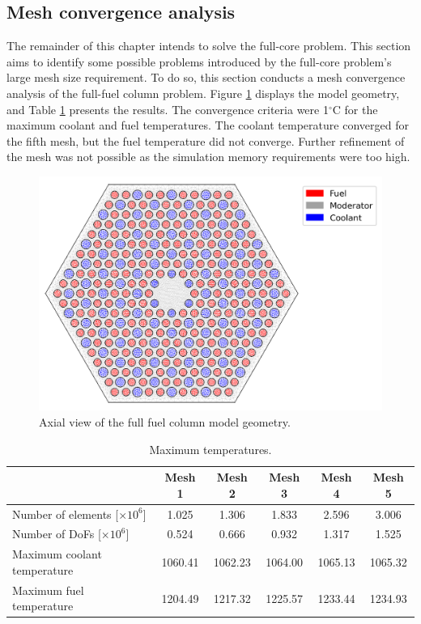 \subsection{Mesh convergence analysis}
\label{sec:meshconverge}

The remainder of this chapter intends to solve the full-core problem.
This section aims to identify some possible problems introduced by the full-core problem's large mesh size requirement.
To do so, this section conducts a mesh convergence analysis of the full-fuel column problem.
Figure \ref{fig:th-full-assem-mesh} displays the model geometry, and Table \ref{tab:th-full-assem-results} presents the results.
The convergence criteria were 1$^{\circ}$C for the maximum coolant and fuel temperatures.
The coolant temperature converged for the fifth mesh, but the fuel temperature did not converge.
Further refinement of the mesh was not possible as the simulation memory requirements were too high.

\begin{figure}[htbp!]
  \centering
  \includegraphics[width=0.45\linewidth]{figures-thermal/full-assem-mesh2}
  \hfill
  \caption{Axial view of the full fuel column model geometry.}
  \label{fig:th-full-assem-mesh}
\end{figure}

\begin{table}[htbp!]
  \centering
  \caption{Maximum temperatures.}
  \label{tab:th-full-assem-results}
\begin{tabular}{l|ccccc}
\toprule
                            & Mesh 1 & Mesh 2 & Mesh 3 & Mesh 4 & Mesh 5 \\
\midrule
Number of elements [$\times 10^{6}$]  & 1.025 & 1.306 & 1.833 & 2.596 & 3.006 \\
Number of DoFs [$\times 10^{6}$]      & 0.524 & 0.666 & 0.932 & 1.317 & 1.525 \\
Maximum coolant temperature & 1060.41 & 1062.23 & 1064.00 & 1065.13 & 1065.32 \\
Maximum fuel temperature    & 1204.49 & 1217.32 & 1225.57 & 1233.44 & 1234.93 \\
\bottomrule
\end{tabular}
\end{table}

